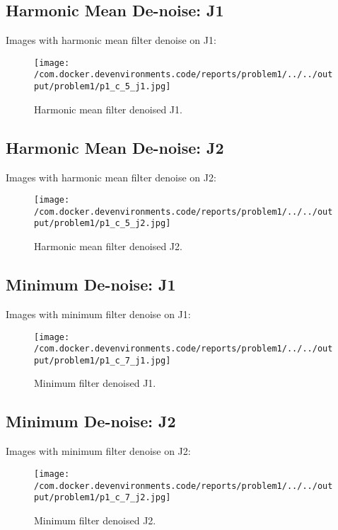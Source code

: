 \documentclass{article}%
\begin{document}
%
\subsection{Harmonic Mean De{-}noise: J1}%
\label{subsec:HarmonicMeanDe{-}noiseJ1}%
Images with harmonic mean filter denoise on J1:%


\begin{figure}[h!]%
\centering%
\texttt{[image: /com.docker.devenvironments.code/reports/problem1/../../output/problem1/p1\_c\_5\_j1.jpg]}%
\caption{Harmonic mean filter denoised J1.}%
\end{figure}

%
\subsection{Harmonic Mean De{-}noise: J2}%
\label{subsec:HarmonicMeanDe{-}noiseJ2}%
Images with harmonic mean filter denoise on J2:%


\begin{figure}[h!]%
\centering%
\texttt{[image: /com.docker.devenvironments.code/reports/problem1/../../output/problem1/p1\_c\_5\_j2.jpg]}%
\caption{Harmonic mean filter denoised J2.}%
\end{figure}

%
\subsection{Minimum De{-}noise: J1}%
\label{subsec:MinimumDe{-}noiseJ1}%
Images with minimum filter denoise on J1:%


\begin{figure}[h!]%
\centering%
\texttt{[image: /com.docker.devenvironments.code/reports/problem1/../../output/problem1/p1\_c\_7\_j1.jpg]}%
\caption{Minimum filter denoised J1.}%
\end{figure}

%
\subsection{Minimum De{-}noise: J2}%
\label{subsec:MinimumDe{-}noiseJ2}%
Images with minimum filter denoise on J2:%


\begin{figure}[h!]%
\centering%
\texttt{[image: /com.docker.devenvironments.code/reports/problem1/../../output/problem1/p1\_c\_7\_j2.jpg]}%
\caption{Minimum filter denoised J2.}%
\end{figure}
\end{document}
